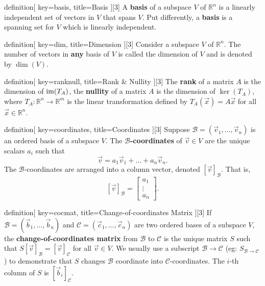 \begin{SaveConcept}{definition}[
		key=basis,
		title={Basis}
	][3]
        A {\bf basis} of a subspace $V$ of $\mathbb R^n$ is a linearly independent set of vectors in $V$ that spans $V$. Put differently, a {\bf basis} is a spanning set for $V$ which is linearly independent. 
\end{SaveConcept}


\begin{SaveConcept}{definition}[
		key=dim,
		title={Dimension}
	][3]
      Consider a subspace $V$ of $\mathbb R^n$. The number of vectors in \textbf{any} basis of $V$ is called the dimension of $V$ and is denoted by $\dim(V)$. 
\end{SaveConcept}


\begin{SaveConcept}{definition}[
		key=ranknull,
		title={Rank \& Nullity}
	][3]
       The {\bf rank} of a matrix $A$ is the dimension of $\operatorname{im}(T_A)$, the \textbf{nullity} of a matrix $A$ is the  dimension of $\ker(T_A)$, where $T_A:\mathbb R^n\to\mathbb R^m$ is the linear transformation defined by $T_A(\vec{x})=A\vec{x}$ for all $\vec{x}\in\mathbb R^n$.
\end{SaveConcept}


\begin{SaveConcept}{definition}[
		key=coordinates,
		title={Coordinates}
	][3]
        Suppose $\mathcal{B} = (\vec v_1, \ldots  , \vec v_n)$ is an ordered basis of a subspace $V$. The {\bf  $\mathcal B$-coordinates} of  $\vec v \in V$  are the unique scalars $a_i$ such that 
        $$
        \vec v = a_1 \vec v_1 + \dots + a_n \vec v_n. 
        $$ 
        The $\mathcal B$-coordinates are arranged into  a column vector, denoted  $[\vec v]_{\mathcal B}.$ That is,
        $$ 
        [\vec v]_{\mathcal B} = \begin{bmatrix} a_1 \\ \vdots \\ a_n  \end{bmatrix}.
        $$
\end{SaveConcept}


\begin{SaveConcept}{definition}[
		key=cocmat,
		title={Change-of-coordinates Matrix}
	][3]
        If $\mathcal{B}=(\vec{b}_1,\ldots,\vec{b}_n)$ and $\mathcal{C}=(\vec{c}_1,\ldots,\vec{c}_n)$ are two ordered bases of a subspace $V$, the {\bf change-of-coordinates matrix} from $\mathcal{B}$ to $\mathcal{C}$ is the unique matrix $S$ such that $S[\vec{v}]_{\mathcal{B}}=[\vec{v}]_{\mathcal{C}}$ for all $\vec{v}\in V$. We usually use a subscript $\mathcal{B}\to\mathcal{C}$ (eg: $S_{\mathcal{B}\to\mathcal{C}}$) to demonstrate that $S$ changes $\mathcal B$ coordinate into $\mathcal C$-coordinates. The $i$-th column of $S$ is $[\vec{b}_i]_{\mathcal{C}}$.
\end{SaveConcept}


